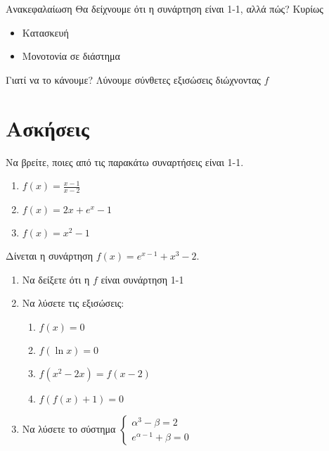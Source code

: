 \documentclass{presentation}
\begin{document}
\begin{frame}{Ανακεφαλαίωση}
  Θα δείχνουμε ότι η συνάρτηση είναι 1-1, αλλά πώς? \pause
  Κυρίως
  \begin{itemize}
    \item Κατασκευή \pause
    \item Μονοτονία σε διάστημα
  \end{itemize} \pause
  \begin{alertblock}{Γιατί να το κάνουμε?}
    Λύνουμε σύνθετες εξισώσεις διώχνοντας $f$
  \end{alertblock}
\end{frame}

\section{Ασκήσεις}
\begin{askisi}
  Να βρείτε, ποιες από τις  παρακάτω συναρτήσεις είναι 1-1.
  \begin{enumerate}
    \item $f(x)=\frac{x-1}{x-2}$\pause
    \item $f(x)=2x+e^x-1$\pause
    \item $f(x)=x^2-1$
  \end{enumerate}
\end{askisi}

\begin{askisi}
  Δίνεται η συνάρτηση $f(x)=e^{x-1}+x^3-2$.
  \begin{enumerate}
    \item Να δείξετε ότι η $f$ είναι συνάρτηση 1-1 \pause
    \item Να λύσετε τις εξισώσεις:
          \begin{enumerate}
            \item $f(x)=0$ \pause
            \item $f(\ln x)=0$ \pause
            \item $f(x^2-2x)=f(x-2)$ \pause
            \item $f\left(f(x)+1\right)=0$ \pause
          \end{enumerate}
    \item Να λύσετε το σύστημα $\begin{cases}
              α^3-β=2 \\
              e^{α-1}+β=0
            \end{cases}$
  \end{enumerate}
\end{askisi}
\end{document}
